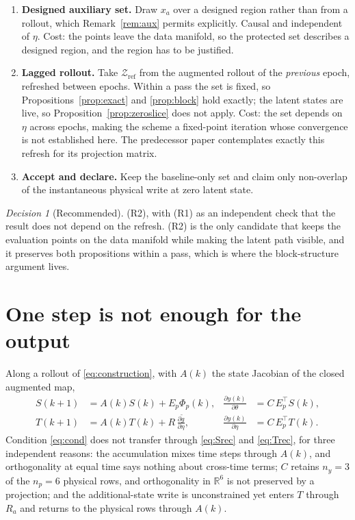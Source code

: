 \documentclass[11pt,a4paper]{article}
\newcommand{\R}{\mathbb R}
\theoremstyle{remark}
\newtheorem{decision}[proposition]{Decision}
\begin{document}
\begin{enumerate}
\item[(R1)] \textbf{Designed auxiliary set.} Draw $x_a$ over a designed region rather than from a
rollout, which Remark~\ref{rem:aux} permits explicitly. Causal and independent of $\eta$. Cost:
the points leave the data manifold, so the protected set describes a designed region, and the
region has to be justified.
\item[(R2)] \textbf{Lagged rollout.} Take $\mathcal Z_{\mathrm{ref}}$ from the augmented rollout
of the \emph{previous} epoch, refreshed between epochs. Within a pass the set is fixed, so
Propositions~\ref{prop:exact} and \ref{prop:block} hold exactly; the latent states are live, so
Proposition~\ref{prop:zeroslice} does not apply. Cost: the set depends on $\eta$ across epochs,
making the scheme a fixed-point iteration whose convergence is not established here. The
predecessor paper contemplates exactly this refresh for its projection matrix.
\item[(R3)] \textbf{Accept and declare.} Keep the baseline-only set and claim only non-overlap of
the instantaneous physical write at zero latent state.
\end{enumerate}

\begin{decision}[Recommended]
(R2), with (R1) as an independent check that the result does not depend on the refresh. (R2)
is the only candidate that keeps the evaluation points on the data manifold while making the
latent path visible, and it preserves both propositions within a pass, which is where the
block-structure argument lives.
\end{decision}

\section{One step is not enough for the output}\label{sec:nonprop}

Along a rollout of \eqref{eq:construction}, with $A(k)$ the state Jacobian of the closed augmented
map,
\begin{align}
 S(k+1)&=A(k)S(k)+E_p\Phi_p(k),
 &\frac{\partial y(k)}{\partial\theta}&=C\,E_p^\top S(k),\label{eq:Srec}\\
 T(k+1)&=A(k)T(k)+R\,\frac{\partial \widetilde g}{\partial\eta},
 &\frac{\partial y(k)}{\partial\eta}&=C\,E_p^\top T(k).\label{eq:Trec}
\end{align}
Condition \eqref{eq:cond} does not transfer through \eqref{eq:Srec} and \eqref{eq:Trec}, for three
independent reasons: the accumulation mixes time steps through $A(k)$, and orthogonality at equal
time says nothing about cross-time terms; $C$ retains $n_y=3$ of the $n_p=6$ physical rows, and
orthogonality in $\R^{6}$ is not preserved by a projection; and the additional-state write is
unconstrained yet enters $T$ through $R_a$ and returns to the physical rows through $A(k)$.
\end{document}
